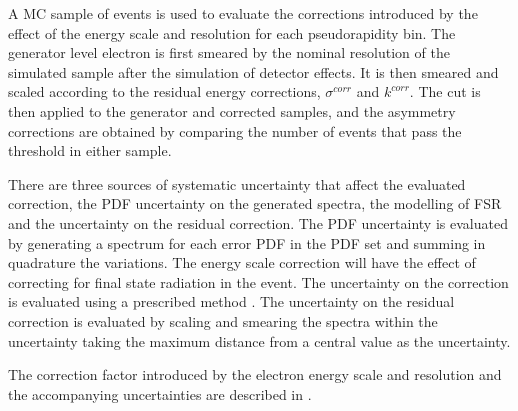 
A {MC} sample of \HepProcess{\PW\to\Pe\Pnue} events is used to evaluate the
corrections introduced by the effect of the energy scale and resolution for each
pseudorapidity bin. The generator level electron \pT is first smeared by the
nominal \pT resolution of the simulated sample after the simulation of detector
effects. It is then smeared and scaled according to the residual energy
corrections, $\sigma^{corr}$ and $k^{corr}$. The \pT cut is then applied to the
generator and corrected samples, and the asymmetry corrections are obtained by
comparing the number of events that pass the threshold in either sample.

There are three sources of systematic uncertainty that affect the evaluated
correction, the {PDF} uncertainty on the generated \pT spectra, the modelling of
{FSR} and the uncertainty on the residual correction. The {PDF} uncertainty is
evaluated by generating a \pT spectrum for each error {PDF}  in the {PDF} set
and summing in quadrature the variations.  The energy scale correction will have
the effect of correcting for final state radiation in the event. The uncertainty
on the correction is evaluated using a prescribed method
\cite{SWGuideEWKUtilities}.  The uncertainty on the residual correction is
evaluated by scaling and smearing the \pT spectra within the uncertainty taking
the maximum distance from a central value as the uncertainty.  

The correction factor introduced by the electron energy scale and resolution and
the accompanying uncertainties are described in .

